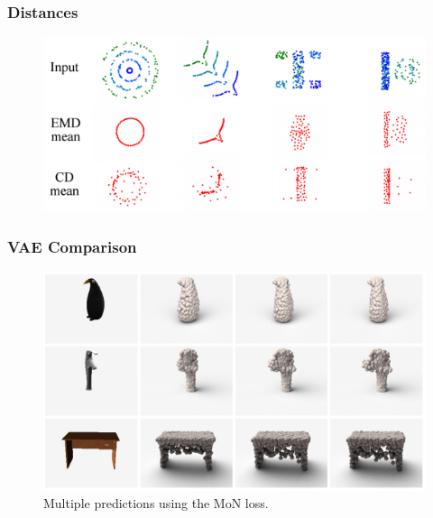 \documentclass[14pt]{beamer}
\begin{document}
  \begin{appendix}
    \begin{frame}
      \frametitle{Distances}
      \begin{figure}
        \centering
        \includegraphics[scale=0.35]{cd_emd}
      \end{figure}
    \end{frame}
    
    \begin{frame}
      \frametitle{VAE Comparison}
      \begin{figure}
        \centering
        \includegraphics[scale=0.65]{multiple_mon}
        \caption{Multiple predictions using the MoN loss.}
      \end{figure}
    \end{frame}
    

\end{appendix}
\end{document}
